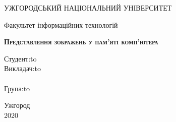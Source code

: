 \begin{titlepage}
    \newpage

    \begin{center}
        УЖГОРОДСЬКИЙ НАЦІОНАЛЬНИЙ УНІВЕРСИТЕТ \\
    \end{center}

    \vspace{8em}

    \begin{center}
        \Large Факультет інформаційних технологій \\
    \end{center}

    \vspace{2em}

    \begin{center}
        \textsc{\textbf{Представлення зображень \linebreak у пам’яті комп’ютера}}
    \end{center}

    \vspace{6em}



    \newbox{\lbox}
    \newlength{\maxl}
    \setlength{\maxl}{\wd\lbox}
    \hfill\parbox{11cm}{
    \hspace*{5cm}\hspace*{-5cm}Студент:\hfill\hbox to\\
    \hspace*{5cm}\hspace*{-5cm}Викладач:\hfill\hbox to\\
    \\
    \hspace*{5cm}\hspace*{-5cm}Група:\hfill\hbox to\\
    }


    \vspace{\fill}

    \begin{center}
        Ужгород \\2020
    \end{center}

\end{titlepage}
